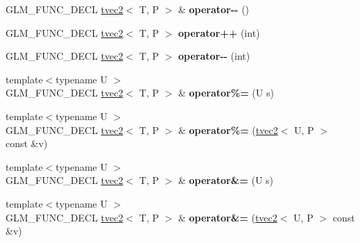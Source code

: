 \begin{DoxyCompactItemize}
\item 
\hypertarget{structglm_1_1detail_1_1tvec2_a0ce16e6435066b8722def0673e5a63e2}{G\-L\-M\-\_\-\-F\-U\-N\-C\-\_\-\-D\-E\-C\-L \hyperlink{structglm_1_1detail_1_1tvec2}{tvec2}$<$ T, P $>$ \& {\bfseries operator-\/-\/} ()}\label{structglm_1_1detail_1_1tvec2_a0ce16e6435066b8722def0673e5a63e2}

\item 
\hypertarget{structglm_1_1detail_1_1tvec2_aae07e6b50de77040b6fbbda6a179a5e3}{G\-L\-M\-\_\-\-F\-U\-N\-C\-\_\-\-D\-E\-C\-L \hyperlink{structglm_1_1detail_1_1tvec2}{tvec2}$<$ T, P $>$ {\bfseries operator++} (int)}\label{structglm_1_1detail_1_1tvec2_aae07e6b50de77040b6fbbda6a179a5e3}

\item 
\hypertarget{structglm_1_1detail_1_1tvec2_a7335fd9b904d01e325117227054f9d93}{G\-L\-M\-\_\-\-F\-U\-N\-C\-\_\-\-D\-E\-C\-L \hyperlink{structglm_1_1detail_1_1tvec2}{tvec2}$<$ T, P $>$ {\bfseries operator-\/-\/} (int)}\label{structglm_1_1detail_1_1tvec2_a7335fd9b904d01e325117227054f9d93}

\item 
\hypertarget{structglm_1_1detail_1_1tvec2_a1aafefd65ee6be5c33c981f710ef7949}{{\footnotesize template$<$typename U $>$ }\\G\-L\-M\-\_\-\-F\-U\-N\-C\-\_\-\-D\-E\-C\-L \hyperlink{structglm_1_1detail_1_1tvec2}{tvec2}$<$ T, P $>$ \& {\bfseries operator\%=} (U s)}\label{structglm_1_1detail_1_1tvec2_a1aafefd65ee6be5c33c981f710ef7949}

\item 
\hypertarget{structglm_1_1detail_1_1tvec2_aef1cf765d277bd24d32a999a353e130b}{{\footnotesize template$<$typename U $>$ }\\G\-L\-M\-\_\-\-F\-U\-N\-C\-\_\-\-D\-E\-C\-L \hyperlink{structglm_1_1detail_1_1tvec2}{tvec2}$<$ T, P $>$ \& {\bfseries operator\%=} (\hyperlink{structglm_1_1detail_1_1tvec2}{tvec2}$<$ U, P $>$ const \&v)}\label{structglm_1_1detail_1_1tvec2_aef1cf765d277bd24d32a999a353e130b}

\item 
\hypertarget{structglm_1_1detail_1_1tvec2_aac48896750ccf159b9a58b8576ffe536}{{\footnotesize template$<$typename U $>$ }\\G\-L\-M\-\_\-\-F\-U\-N\-C\-\_\-\-D\-E\-C\-L \hyperlink{structglm_1_1detail_1_1tvec2}{tvec2}$<$ T, P $>$ \& {\bfseries operator\&=} (U s)}\label{structglm_1_1detail_1_1tvec2_aac48896750ccf159b9a58b8576ffe536}

\item 
\hypertarget{structglm_1_1detail_1_1tvec2_ab09cab89bbc393f33048cfe08a4bd620}{{\footnotesize template$<$typename U $>$ }\\G\-L\-M\-\_\-\-F\-U\-N\-C\-\_\-\-D\-E\-C\-L \hyperlink{structglm_1_1detail_1_1tvec2}{tvec2}$<$ T, P $>$ \& {\bfseries operator\&=} (\hyperlink{structglm_1_1detail_1_1tvec2}{tvec2}$<$ U, P $>$ const \&v)}\label{structglm_1_1detail_1_1tvec2_ab09cab89bbc393f33048cfe08a4bd620}


\end{DoxyCompactItemize}
